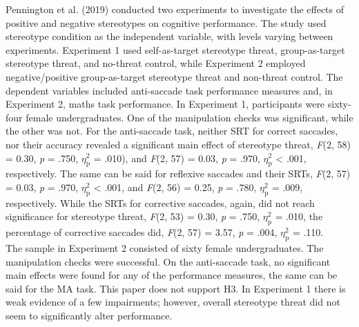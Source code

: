 \documentclass[
  stu, a4paper,floatsintext]{apa7}
\begin{document}
Pennington et al. (2019) conducted two experiments to investigate the effects of positive and negative stereotypes on cognitive performance.
The study used stereotype condition as the independent variable, with levels varying between experiments.
Experiment 1 used self-as-target stereotype threat, group-as-target stereotype threat, and no-threat control, while Experiment 2 employed negative/positive group-as-target stereotype threat and non-threat control.
The dependent variables included anti-saccade task performance measures and, in Experiment 2, maths task performance.
In Experiment 1, participants were sixty-four female undergraduates.
One of the manipulation checks was significant, while the other was not.
For the anti-saccade task, neither SRT for correct saccades, nor their accuracy revealed a significant main effect of stereotype threat, \emph{F}(2, 58) = 0.30, \emph{p} = .750, \(\eta^{2}_{\text{p}}\) = .010), and \emph{F}(2, 57) = 0.03, \emph{p} = .970, \(\eta^{2}_{\text{p}}\) \textless{} .001, respectively.
The same can be said for reflexive saccades and their SRTs, \emph{F}(2, 57) = 0.03, \emph{p} = .970, \(\eta^{2}_{\text{p}}\) \textless{} .001, and \emph{F}(2, 56) = 0.25, \emph{p} = .780, \(\eta^{2}_{\text{p}}\) = .009, respectively.
While the SRTs for corrective saccades, again, did not reach significance for stereotype threat, \emph{F}(2, 53) = 0.30, \emph{p} = .750, \(\eta^{2}_{\text{p}}\) = .010, the percentage of corrective saccades did, \emph{F}(2, 57) = 3.57, \emph{p} = .004, \(\eta^{2}_{\text{p}}\) = .110.\\
The sample in Experiment 2 consisted of sixty female undergraduates.
The manipulation checks were successful.
On the anti-saccade task, no significant main effects were found for any of the performance measures, the same can be said for the MA task.
This paper does not support H3. In Experiment 1 there is weak evidence of a few impairments; however, overall stereotype threat did not seem to significantly alter performance.
\end{document}

